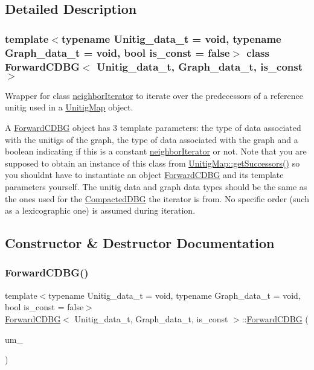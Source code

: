 \subsection{Detailed Description}
\subsubsection*{template$<$typename Unitig\+\_\+data\+\_\+t = void, typename Graph\+\_\+data\+\_\+t = void, bool is\+\_\+const = false$>$\newline
class Forward\+C\+D\+B\+G$<$ Unitig\+\_\+data\+\_\+t, Graph\+\_\+data\+\_\+t, is\+\_\+const $>$}

Wrapper for class \hyperlink{classneighborIterator}{neighbor\+Iterator} to iterate over the predecessors of a reference unitig used in a \hyperlink{classUnitigMap}{Unitig\+Map} object. 

A \hyperlink{classForwardCDBG}{Forward\+C\+D\+BG} object has 3 template parameters\+: the type of data associated with the unitigs of the graph, the type of data associated with the graph and a boolean indicating if this is a constant \hyperlink{classneighborIterator}{neighbor\+Iterator} or not. Note that you are supposed to obtain an instance of this class from \hyperlink{classUnitigMap_a5b2894e0f78e6b003d06a03a49904b59}{Unitig\+Map\+::get\+Successors()} so you shouldn\textquotesingle{}t have to instantiate an object \hyperlink{classForwardCDBG}{Forward\+C\+D\+BG} and its template parameters yourself. The unitig data and graph data types should be the same as the ones used for the \hyperlink{classCompactedDBG}{Compacted\+D\+BG} the iterator is from. No specific order (such as a lexicographic one) is assumed during iteration. 

\subsection{Constructor \& Destructor Documentation}
\mbox{\label{classForwardCDBG_ae4cc2b8a705fb9555fba4f31bfcc7bdb}} 
\subsubsection{\texorpdfstring{Forward\+C\+D\+B\+G()}{ForwardCDBG()}}
{\footnotesize\ttfamily template$<$typename Unitig\+\_\+data\+\_\+t  = void, typename Graph\+\_\+data\+\_\+t  = void, bool is\+\_\+const = false$>$ \\
\hyperlink{classForwardCDBG}{Forward\+C\+D\+BG}$<$ Unitig\+\_\+data\+\_\+t, Graph\+\_\+data\+\_\+t, is\+\_\+const $>$\+::\hyperlink{classForwardCDBG}{Forward\+C\+D\+BG} (\begin{DoxyParamCaption}\item[{const \hyperlink{classUnitigMap}{Unitig\+Map}$<$ U, G, is\+\_\+const $>$ \&}]{um\+\_\+ }\end{DoxyParamCaption})\hspace{0.3cm}{\ttfamily [explicit]}}



